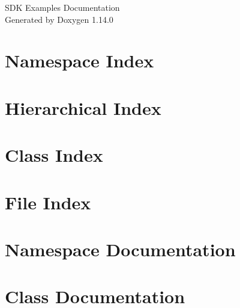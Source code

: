 \documentclass[twoside]{book}
\newcommand{\+}{\discretionary{\mbox{\scriptsize$\hookleftarrow$}}{}{}}
\newcommand{\clearemptydoublepage}{%
    \newpage{\pagestyle{empty}\cleardoublepage}%
  }
\begin{document}
  \raggedbottom
    \hypersetup{pageanchor=false,
                bookmarksnumbered=true,
                pdfencoding=unicode
               }
  \begin{titlepage}
  \vspace*{7cm}
  \begin{center}%
  {\Large SDK Examples Documentation}\\
  \vspace*{1cm}
  {\large Generated by Doxygen 1.14.0}\\
  \end{center}
  \end{titlepage}
  \clearemptydoublepage
  \tableofcontents
  \clearemptydoublepage
  \hypersetup{pageanchor=true}
\chapter{Namespace Index}

\chapter{Hierarchical Index}

\chapter{Class Index}

\chapter{File Index}

\chapter{Namespace Documentation}


\chapter{Class Documentation}




\end{document}
